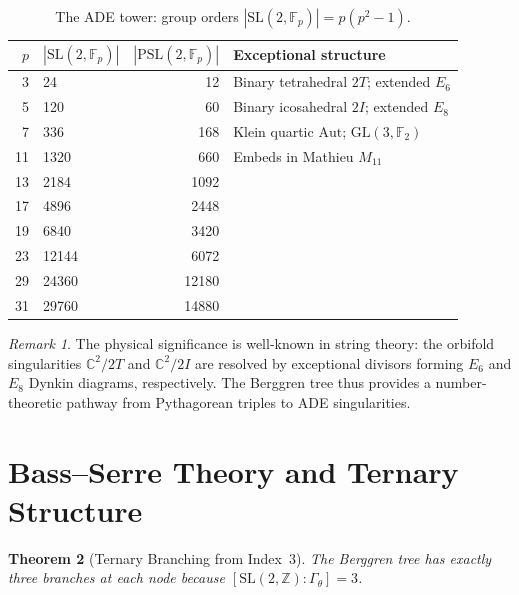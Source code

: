 \documentclass[12pt]{amsart}
\newtheorem{theorem}{Theorem}[section]
\theoremstyle{definition}
\theoremstyle{remark}
\newtheorem{remark}[theorem]{Remark}
\newcommand{\SL}{\mathrm{SL}}
\newcommand{\PSL}{\mathrm{PSL}}
\newcommand{\GL}{\mathrm{GL}}
\newcommand{\Aut}{\mathrm{Aut}}
\newcommand{\Fp}{\mathbb{F}_p}
\newcommand{\Z}{\mathbb{Z}}
\newcommand{\C}{\mathbb{C}}
\newcommand{\Gtheta}{\Gamma_\theta}
\begin{document}
\begin{table}[ht]
\centering
\caption{The ADE tower: group orders $|\SL(2,\Fp)| = p(p^2-1)$.}
\label{tab:ade}
\begin{tabular}{rlrl}
\toprule
$p$ & $|\SL(2,\Fp)|$ & $|\PSL(2,\Fp)|$ & Exceptional structure \\
\midrule
3  & 24    & 12   & Binary tetrahedral $2T$; extended $E_6$ \\
5  & 120   & 60   & Binary icosahedral $2I$; extended $E_8$ \\
7  & 336   & 168  & Klein quartic $\Aut$; $\GL(3,\mathbb{F}_2)$ \\
11 & 1320  & 660  & Embeds in Mathieu $M_{11}$ \\
13 & 2184  & 1092 & \\
17 & 4896  & 2448 & \\
19 & 6840  & 3420 & \\
23 & 12144 & 6072 & \\
29 & 24360 & 12180& \\
31 & 29760 & 14880& \\
\bottomrule
\end{tabular}
\end{table}

\begin{remark}
The physical significance is well-known in string theory: the orbifold
singularities $\C^2/2T$ and $\C^2/2I$ are resolved by exceptional
divisors forming $E_6$ and $E_8$ Dynkin diagrams, respectively.  The
Berggren tree thus provides a number-theoretic pathway from Pythagorean
triples to ADE singularities.
\end{remark}


\section{Bass--Serre Theory and Ternary Structure}\label{sec:bassserre}

\begin{theorem}[Ternary Branching from Index~3]\label{thm:bassserre}
The Berggren tree has exactly three branches at each node because
$[\SL(2,\Z) : \Gtheta] = 3$.
\end{theorem}
\end{document}
